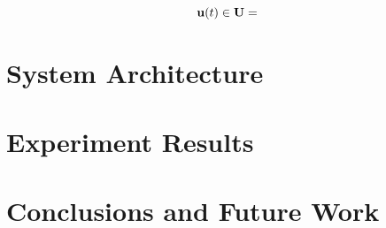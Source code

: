 \documentclass[letterpaper, 10 pt, conference]{ieeeconf}
\begin{document}
\begin{equation}
  \textbf{u}(t) \in \textbf{U} = \\
\end{equation}

\section{System Architecture}


\section{Experiment Results}



\section{Conclusions and Future Work}



\end{document}
